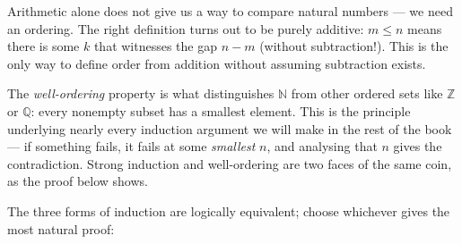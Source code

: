 \documentclass[12pt, openany]{book}
\theoremstyle{plain}
\theoremstyle{definition}
\theoremstyle{remark}
\newcommand{\N}{\mathbb{N}}
\newcommand{\Z}{\mathbb{Z}}
\newcommand{\Q}{\mathbb{Q}}
\begin{document}
Arithmetic alone does not give us a way to compare natural numbers --- we need an ordering.  The right definition turns out to be purely additive: $m \leq n$ means there is some $k$ that witnesses the gap $n - m$ (without subtraction!).  This is the only way to define order from addition without assuming subtraction exists.

The \emph{well-ordering} property is what distinguishes $\N$ from other ordered sets like $\Z$ or $\Q$: every nonempty subset has a smallest element.  This is the principle underlying nearly every induction argument we will make in the rest of the book --- if something fails, it fails at some \emph{smallest} $n$, and analysing that $n$ gives the contradiction.  Strong induction and well-ordering are two faces of the same coin, as the proof below shows.

The three forms of induction are logically equivalent; choose whichever gives the most natural proof:
\end{document}
